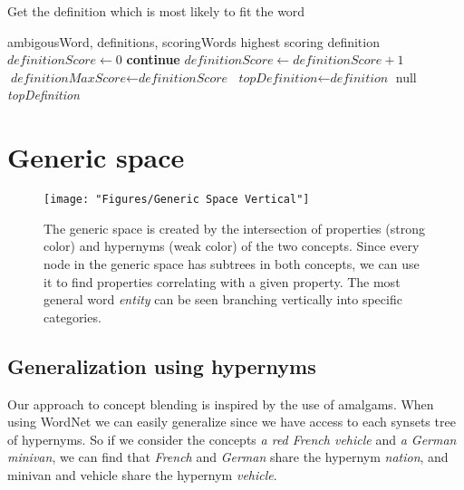 \begin{algorithm}
	\caption{Get the definition which is most likely to fit the word}\label{alg:getMostLikelyDefinition}
	\begin{algorithmic}[1]
		\Require ambigousWord,
		definitions,
		scoringWords
		\Ensure highest scoring definition
		\State $\textit{definitionScore} \gets 0$
		\State \textbf{continue}
		\EndIf
		\State ${\textit{definitionScore} \gets {\textit{definitionScore}+1}}$
		\EndIf
		\EndFor
		\EndFor
		\State ${\textit{definitionMaxScore}} \gets {\textit{definitionScore}}$
		\State ${\textit{topDefinition}} \gets {\textit{definition}}$
		\EndIf
		\EndFor
		\Return null
		\EndIf
		\State \Return \textit{topDefinition}
		\EndProcedure
	\end{algorithmic}
\end{algorithm}


\section{Generic space}

\begin{figure}
\centering
\texttt{[image: "Figures/Generic Space Vertical"]}
\caption[Generic space]{The generic space is created by the intersection of properties (strong color) and hypernyms (weak color) of the two concepts. Since every node in the generic space has subtrees in both concepts, we can use it to find properties correlating with a given property. The most general word \emph{entity} can be seen branching vertically into specific categories.}
\label{fig:generic-space-vertical}
\end{figure}


\subsection{Generalization using hypernyms}
Our approach to concept blending is inspired by the use of amalgams. When using WordNet we can easily generalize since we have access to each synsets tree of hypernyms. So if we consider the concepts \emph{a red French vehicle} and \emph{a German minivan}, we can find that \emph{French} and \emph{German} share the hypernym \emph{nation}, and minivan and vehicle share the hypernym \emph{vehicle}.

